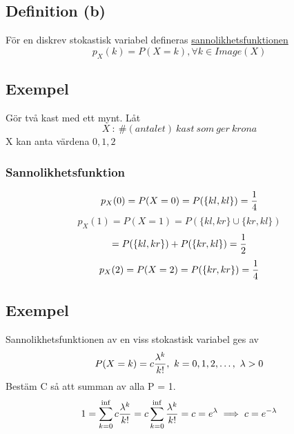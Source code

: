 \documentclass{article}
\begin{document}
\subsection{Definition (b)}
För en diskrev stokastisk variabel defineras \underline{sannolikhetsfunktionen}
$$ p_X(k) = P(X=k), \forall k\in Image(X)$$

\subsection{Exempel}
Gör två kast med ett mynt. Låt
$$ X\ :\ \#(antalet)\ kast\ som\ ger\ krona $$
X kan anta värdena $0, 1, 2$

\subsubsection{Sannolikhetsfunktion}
$$ p_X(0) = P(X=0) = P(\{ kl, kl \}) = \frac{1}{4} $$
$$ p_X(1) = P(X=1) = P(\{ kl, kr \} \cup \{ kr, kl \}) $$
$$ = P(\{ kl, kr \}) + P(\{ kr, kl \}) = \frac{1}{2}$$
$$ p_X(2) = P(X=2) = P(\{ kr, kr \}) = \frac{1}{4}$$

\subsection{Exempel}
Sannolikhetsfunktionen av en viss stokastisk variabel ges av 
$$ P(X=k) = c\f{\lambda^k}{k!},\ k=0,1,2,\dots,\ \lambda>0 $$
Bestäm C så att summan av alla P = 1.
$$ 1 = \sum_{k=0}^{\inf} c\frac{\lambda^k}{k!}= c\sum_{k=0}^{\inf} \frac{\lambda^k}{k!} = c=e^\lambda \implies c=e^{-\lambda}  $$
\end{document}
